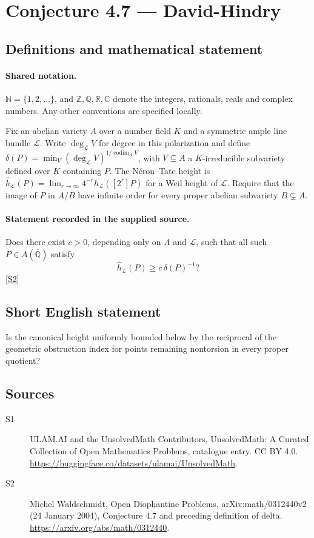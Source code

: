 \documentclass[11pt]{article}
\newcommand{\sref}[2]{\hyperlink{source:#1:#2}{[S#2]}}
\begin{document}
\section{Conjecture 4.7 — David-Hindry}\label{statement}

\subsection{Definitions and mathematical statement}

\paragraph{Shared notation.}$\mathbb N=\{1,2,\ldots\}$, and $\mathbb Z,\mathbb Q,\mathbb R,\mathbb C$ denote the integers, rationals, reals and complex numbers. Any other conventions are specified locally.


Fix an abelian variety $A$ over a number field $K$ and a symmetric ample line bundle $\mathcal L$. Write $\deg_{\mathcal L}V$ for degree in this polarization and define $\delta(P)=\min_V(\deg_{\mathcal L}V)^{1/\operatorname{codim}_A V}$, with $V\subsetneq A$ a $K$-irreducible subvariety defined over $K$ containing $P$. The N\'eron--Tate height is $\widehat h_{\mathcal L}(P)=\lim_{r\to\infty}4^{-r}h_{\mathcal L}([2^r]P)$ for a Weil height of $\mathcal L$. Require that the image of $P$ in $A/B$ have infinite order for every proper abelian subvariety $B\subsetneq A$.
\paragraph{Statement recorded in the supplied source.}
Does there exist $c>0$, depending only on $A$ and $\mathcal L$, such that all such $P\in A(\overline{\mathbb Q})$ satisfy \[\widehat h_{\mathcal L}(P)\ge c\,\delta(P)^{-1}?\] \sref{statement}{2}
\subsection{Short English statement}
Is the canonical height uniformly bounded below by the reciprocal of the geometric obstruction index for points remaining nontorsion in every proper quotient?
\subsection{Sources}
\begin{description}
\item[\hypertarget{source:statement:1}{S1}] ULAM.AI and the UnsolvedMath Contributors, UnsolvedMath: A Curated Collection of Open Mathematics Problems, catalogue entry. CC BY 4.0. \url{https://huggingface.co/datasets/ulamai/UnsolvedMath}.
\item[\hypertarget{source:statement:2}{S2}] Michel Waldschmidt, Open Diophantine Problems, arXiv:math/0312440v2 (24 January 2004), Conjecture 4.7 and preceding definition of delta. \url{https://arxiv.org/abs/math/0312440}.
\end{description}
\label{end:statement}
\end{document}
